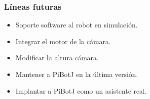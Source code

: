 \documentclass{beamer}
\begin{document}
\begin{frame}
\frametitle{Líneas futuras}
\begin{itemize}
\item Soporte software al robot en simulación.
\item Integrar el motor de la cámara.
\item Modificar la altura cámara.
\item Mantener a PiBotJ en la última versión.
\item Implantar a PiBotJ como un asistente real.
\end{itemize}
\end{frame}

\begin{frame}[plain]
\large{\titlepage}
\end{frame}



\end{document}
